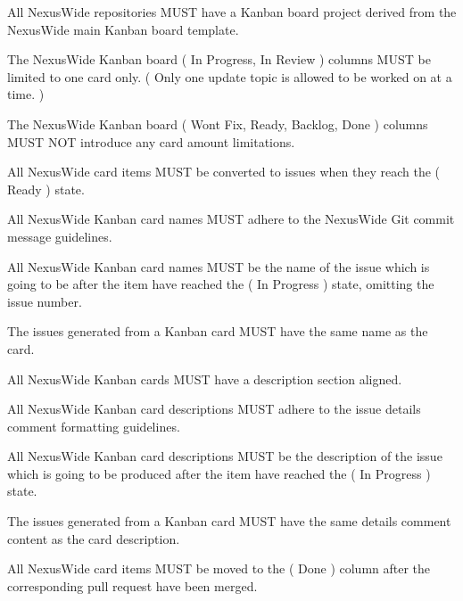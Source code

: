 \documentclass[13pt]{scrarticle}
\newcommand{\nexusrule}[1]{\Tribar[1][white][yellow][red]\color{blue} #1}
\begin{document}
      \nexusrule{ All NexusWide repositories MUST have a Kanban board project derived from the NexusWide main Kanban board template.} \newline

      \nexusrule{ The NexusWide Kanban board ( In Progress, In Review ) columns MUST be limited to one card only. ( Only one update topic is allowed to be worked on at a time. )} \newline

      \nexusrule{ The NexusWide Kanban board ( Wont Fix, Ready, Backlog, Done ) columns MUST NOT introduce any card amount limitations.} \newline

      \nexusrule{ All NexusWide card items MUST be converted to issues when they reach the ( Ready ) state.} \newline

      \nexusrule{ All NexusWide Kanban card names MUST adhere to the NexusWide Git commit message guidelines.} \newline

      \nexusrule{ All NexusWide Kanban card names MUST be the name of the issue which is going to be after the item have reached the ( In Progress ) state, omitting the issue number.} \newline

      \nexusrule{ The issues generated from a Kanban card MUST have the same name as the card.} \newline

      \nexusrule{ All NexusWide Kanban cards MUST have a description section aligned.} \newline

      \nexusrule{ All NexusWide Kanban card descriptions MUST adhere to the issue details comment formatting guidelines.} \newline

      \nexusrule{ All NexusWide Kanban card descriptions MUST be the description of the issue which is going to be produced after the item have reached the ( In Progress ) state.} \newline

      \nexusrule{ The issues generated from a Kanban card MUST have the same details comment content as the card description.} \newline

      \nexusrule{ All NexusWide card items MUST be moved to the ( Done ) column after the corresponding pull request have been merged.} \newline
\end{document}
